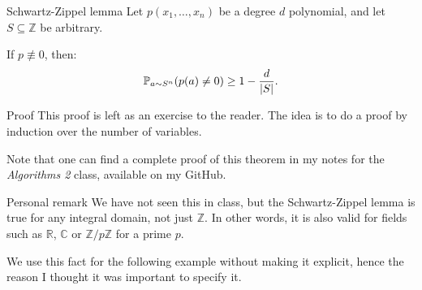 \documentclass[a4paper]{article}
\begin{document}
\begin{parag}{Schwartz-Zippel lemma}
    Let $p\left(x_1, \ldots, x_n\right)$ be a degree $d$ polynomial, and let $S \subseteq \mathbb{Z}$ be arbitrary.

    If $p \not\equiv 0$, then:
    \[\prob_{a \followsdistr S^n} \left(p\left(a\right) \neq 0\right) \geq 1 - \frac{d}{\left|S\right|}.\]
    
    \begin{subparag}{Proof}
        This proof is left as an exercise to the reader. The idea is to do a proof by induction over the number of variables.

        Note that one can find a complete proof of this theorem in my notes for the \textit{Algorithms 2} class, available on my GitHub.
    \end{subparag}

    \begin{subparag}{Personal remark}
        We have not seen this in class, but the Schwartz-Zippel lemma is true for any integral domain, not just $\mathbb{Z}$. In other words, it is also valid for fields such as $\mathbb{R}$, $\mathbb{C}$ or $\mathbb{Z}/p\mathbb{Z}$ for a prime $p$.

        We use this fact for the following example without making it explicit, hence the reason I thought it was important to specify it.
    \end{subparag}
\end{parag}
\end{document}
